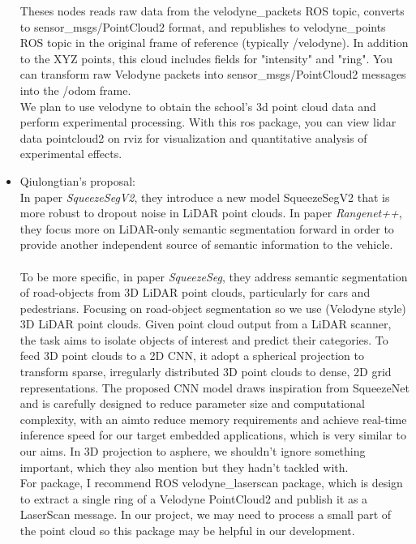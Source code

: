 \documentclass{article}
\begin{document}
\begin{normalsize}
\begin{itemize}
Theses nodes reads raw data from the velodyne\_packets ROS topic, converts to sensor\_msgs/PointCloud2 format, and republishes to velodyne\_points ROS topic in the original frame of reference (typically /velodyne). In addition to the XYZ points, this cloud includes fields for "intensity" and "ring".
You can transform raw Velodyne packets into sensor\_msgs/PointCloud2 messages into the /odom frame.\\
We plan to use velodyne to obtain the school’s 3d point cloud data and perform experimental processing. With this ros package, you can view lidar data pointcloud2 on rviz for visualization and quantitative analysis of experimental effects.\\
\item Qiulongtian's proposal:\\
In paper \emph{SqueezeSegV2}\cite{wu2019squeezesegv2}, they introduce a new model SqueezeSegV2 that is more robust to dropout noise in LiDAR point clouds. In paper \emph{Rangenet++}\cite{milioto2019rangenet++}, they focus  more on LiDAR-only semantic segmentation forward in order to provide another independent source of semantic information to the vehicle. 
\\\\
To be more specific, in paper \emph{SqueezeSeg}\cite{wu2018squeezeseg}, they address semantic segmentation of road-objects from 3D LiDAR point clouds, particularly for cars and pedestrians. Focusing on road-object segmentation so we use (Velodyne style) 3D LiDAR point clouds. Given point cloud output from a LiDAR scanner, the task aims to isolate objects of interest and predict their categories. To feed 3D point clouds to a 2D CNN, it adopt a spherical projection to 
transform sparse, irregularly distributed 3D point clouds to dense, 2D grid representations. The proposed CNN model draws inspiration from SqueezeNet  and is carefully designed to reduce parameter size and computational complexity, with an aimto reduce memory requirements and achieve real-time inference speed for our target embedded applications, which is very similar to our aims. In 3D projection to asphere, we shouldn’t ignore something important, which they also mention but they hadn’t tackled with.
\\
For package, I recommend ROS velodyne\_laserscan package, which is design to extract a single ring of a Velodyne PointCloud2 and publish it as a LaserScan message. In our project, we may need to process a small part of the point cloud so this package may be helpful in our development.


\end{itemize}
\end{normalsize}
\end{document}
